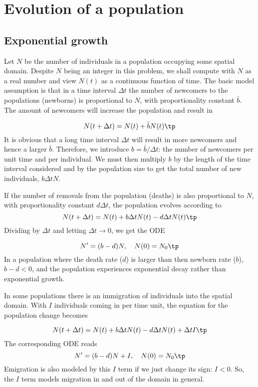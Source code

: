 \documentclass[graybox,sectrefs,envcountresetchap,open=right,final]{svmonodo}
\begin{document}
\section{Evolution of a population}
\label{decay:app:pop}


\subsection{Exponential growth}
\label{decay:app:pop:exp}

Let $N$ be the number of individuals in a population occupying some
spatial domain.  Despite $N$ being an integer in this problem, we
shall compute with $N$ as a real number and view $N(t)$ as a
continuous function of time.  The basic model assumption is that in a
time interval $\Delta t$ the number of newcomers to the populations
(newborns) is proportional to $N$, with proportionality constant $\bar
b$. The amount of newcomers will increase the population and result in

\[ N(t+\Delta t) = N(t) + \bar bN(t)\tp  \]
It is obvious that a long time interval $\Delta t$ will result in
more newcomers and hence a larger $\bar b$. Therefore, we introduce
$b=\bar b/\Delta t$: the number of newcomers per unit time and per
individual. We must then multiply $b$ by the length of the time
interval considered and by the population size to get the
total number of new individuals, $b\Delta t N$.

If the number of removals from the population (deaths) is also
proportional to $N$, with proportionality constant $d\Delta t$,
the population evolves according to
\[ N(t+\Delta t) = N(t) + b\Delta t N(t) - d\Delta t N(t)\tp  \]
Dividing by $\Delta t$ and letting $\Delta t \rightarrow 0$,
we get the ODE

\begin{equation}
N^{\prime} = (b-d)N,\quad N(0)=N_0\tp
\end{equation}
In a population where the death rate ($d$) is larger than
then newborn rate ($b$), $b-d < 0$, and the population experiences
exponential decay rather than exponential growth.

In some populations there is an immigration of individuals into the
spatial domain. With $I$ individuals coming in per time unit,
the equation for the population change becomes

\[ N(t+\Delta t) = N(t) + b\Delta t N(t) - d\Delta t N(t) + \Delta t I\tp  \]
The corresponding ODE reads
\begin{equation}
N^{\prime} = (b-d)N + I,\quad N(0)=N_0
\tp
\end{equation}
Emigration is also modeled by this $I$ term if we just change its sign: $I < 0$.
So, the $I$ term models migration in and out of the domain in general.
\end{document}
